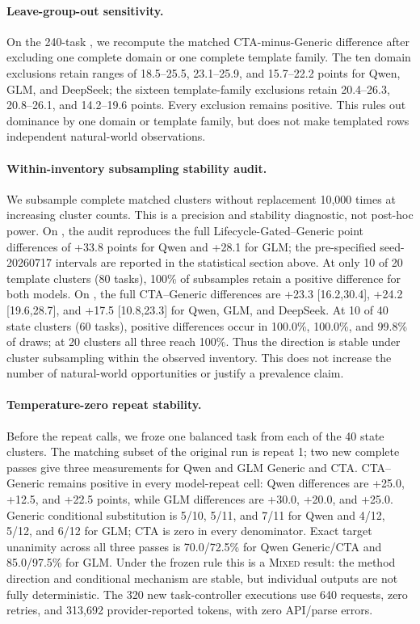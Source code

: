 \documentclass[10pt]{article}
\begin{document}
\paragraph{Leave-group-out sensitivity.}
On the 240-task \NewSchemaReplication{}, we recompute the matched CTA-minus-Generic difference after
excluding one complete domain or one complete template family. The ten domain exclusions retain
ranges of 18.5--25.5, 23.1--25.9, and 15.7--22.2 points for Qwen, GLM, and DeepSeek; the sixteen
template-family exclusions retain 20.4--26.3, 20.8--26.1, and 14.2--19.6 points. Every exclusion
remains positive. This rules out dominance by one domain or template family, but does not make
templated rows independent natural-world observations.

\paragraph{Within-inventory subsampling stability audit.}
We subsample complete matched clusters without replacement 10,000 times at
increasing cluster counts. This is a precision and stability diagnostic, not post-hoc power.
On \PrimaryDiagnostic{}, the audit reproduces the full Lifecycle-Gated--Generic point differences of +33.8 points
for Qwen and +28.1 for GLM; the pre-specified seed-20260717 intervals are reported in the
statistical section above. At only 10 of 20 template clusters (80 tasks), 100\% of subsamples
retain a positive difference for both models. On \NewSchemaReplication{},
the full CTA--Generic differences are +23.3 [16.2,30.4], +24.2 [19.6,28.7], and +17.5
[10.8,23.3] for Qwen, GLM, and DeepSeek. At 10 of 40 state clusters (60 tasks), positive
differences occur in 100.0\%, 100.0\%, and 99.8\% of draws; at 20 clusters all three reach
100\%. Thus the direction is stable under cluster subsampling within the observed inventory.
This does not increase the number of natural-world opportunities or justify a prevalence claim.

\paragraph{Temperature-zero repeat stability.}
Before the repeat calls, we froze one balanced task from each of the 40 \NewSchemaReplication{}
state clusters. The matching subset of the original run is repeat 1; two new complete passes give three measurements for Qwen
and GLM Generic and CTA. CTA--Generic remains positive in every model-repeat cell: Qwen differences
are +25.0, +12.5, and +22.5 points, while GLM differences are +30.0, +20.0, and +25.0. Generic
conditional substitution is 5/10, 5/11, and 7/11 for Qwen and 4/12, 5/12, and 6/12 for GLM; CTA is zero
in every denominator. Exact target unanimity across all three passes is 70.0/72.5\% for Qwen
Generic/CTA and 85.0/97.5\% for GLM. Under the frozen rule this is a \textsc{Mixed} result: the
method direction and conditional mechanism are stable, but individual outputs are not fully
deterministic. The 320 new task-controller executions use 640 requests, zero retries, and 313,692
provider-reported tokens, with zero API/parse errors.
\end{document}
